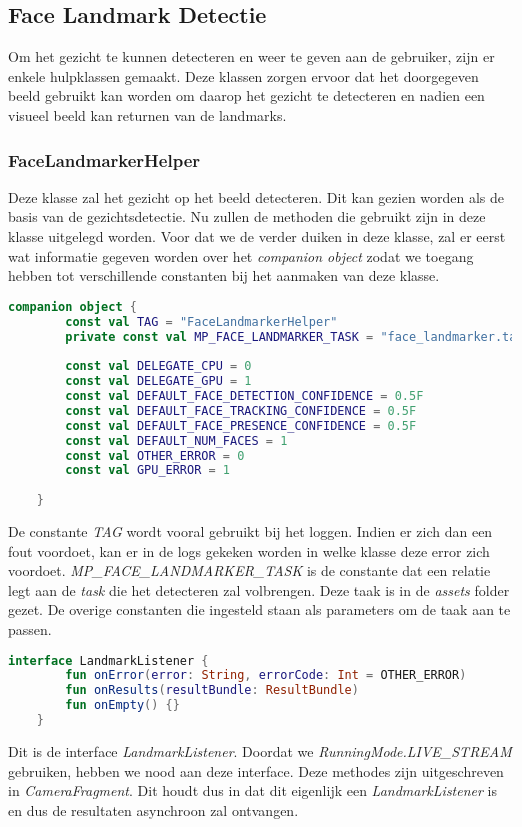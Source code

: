 \subsection{Face Landmark Detectie}
Om het gezicht te kunnen detecteren en weer te geven aan de gebruiker, zijn er enkele hulpklassen gemaakt. Deze klassen zorgen ervoor dat het doorgegeven beeld gebruikt kan worden om daarop het gezicht te detecteren en nadien een visueel beeld kan returnen van de landmarks.

\subsubsection{FaceLandmarkerHelper}
Deze klasse zal het gezicht op het beeld detecteren. Dit kan gezien worden als de basis van de gezichtsdetectie. Nu zullen de methoden die gebruikt zijn in deze klasse uitgelegd worden. Voor dat we de verder duiken in deze klasse, zal er eerst wat informatie gegeven worden over het \emph{companion object} zodat we toegang hebben tot verschillende constanten bij het aanmaken van deze klasse.

\begin{lstlisting}[language=Kotlin, caption=companion object van FaceLandmarkerHelper.kt, label={lst:companionFaceLandmarkerHelper}]
    companion object {
        const val TAG = "FaceLandmarkerHelper"
        private const val MP_FACE_LANDMARKER_TASK = "face_landmarker.task"
        
        const val DELEGATE_CPU = 0
        const val DELEGATE_GPU = 1
        const val DEFAULT_FACE_DETECTION_CONFIDENCE = 0.5F
        const val DEFAULT_FACE_TRACKING_CONFIDENCE = 0.5F
        const val DEFAULT_FACE_PRESENCE_CONFIDENCE = 0.5F
        const val DEFAULT_NUM_FACES = 1
        const val OTHER_ERROR = 0
        const val GPU_ERROR = 1
        
    }
\end{lstlisting}
De constante \emph{TAG} wordt vooral gebruikt bij het loggen. Indien er zich dan een fout voordoet, kan er in de logs gekeken worden in welke klasse deze error zich voordoet. \emph{MP\_FACE\_LANDMARKER\_TASK} is de constante dat een relatie legt aan de \emph{task} die het detecteren zal volbrengen. Deze taak is in de \emph{assets} folder gezet. De overige constanten die ingesteld staan als parameters om de taak aan te passen.

\begin{lstlisting}[language=Kotlin, caption=interface LandmarkListener, label={lst:interfaceLandmarkListener}]
     interface LandmarkListener {
        fun onError(error: String, errorCode: Int = OTHER_ERROR)
        fun onResults(resultBundle: ResultBundle)
        fun onEmpty() {}
    }
\end{lstlisting}
Dit is de interface \emph{LandmarkListener}. Doordat we \emph{RunningMode.LIVE\_STREAM} gebruiken, hebben we nood aan deze interface. Deze methodes zijn uitgeschreven in \emph{CameraFragment}. Dit houdt dus in dat dit eigenlijk een \emph{LandmarkListener} is en dus de resultaten asynchroon zal ontvangen.


